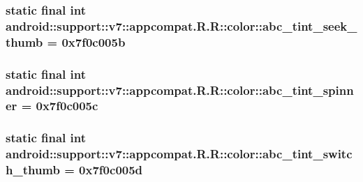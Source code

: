 \hypertarget{classandroid_1_1support_1_1v7_1_1appcompat_1_1_r_1_1color_2f1010b4371d55e9b68d2aaf3a7de5fa}{
\subsubsection[{abc\_\-tint\_\-seek\_\-thumb}]{\setlength{\rightskip}{0pt plus 5cm}static final int android::support::v7::appcompat.R.R::color::abc\_\-tint\_\-seek\_\-thumb = 0x7f0c005b}}
\label{classandroid_1_1support_1_1v7_1_1appcompat_1_1_r_1_1color_2f1010b4371d55e9b68d2aaf3a7de5fa}


\hypertarget{classandroid_1_1support_1_1v7_1_1appcompat_1_1_r_1_1color_4234baec9d762376228292c1c8575e81}{
\subsubsection[{abc\_\-tint\_\-spinner}]{\setlength{\rightskip}{0pt plus 5cm}static final int android::support::v7::appcompat.R.R::color::abc\_\-tint\_\-spinner = 0x7f0c005c}}
\label{classandroid_1_1support_1_1v7_1_1appcompat_1_1_r_1_1color_4234baec9d762376228292c1c8575e81}


\hypertarget{classandroid_1_1support_1_1v7_1_1appcompat_1_1_r_1_1color_0358cccb0edcfb153b6a00e8e0c28bc6}{
\subsubsection[{abc\_\-tint\_\-switch\_\-thumb}]{\setlength{\rightskip}{0pt plus 5cm}static final int android::support::v7::appcompat.R.R::color::abc\_\-tint\_\-switch\_\-thumb = 0x7f0c005d}}
\label{classandroid_1_1support_1_1v7_1_1appcompat_1_1_r_1_1color_0358cccb0edcfb153b6a00e8e0c28bc6}


